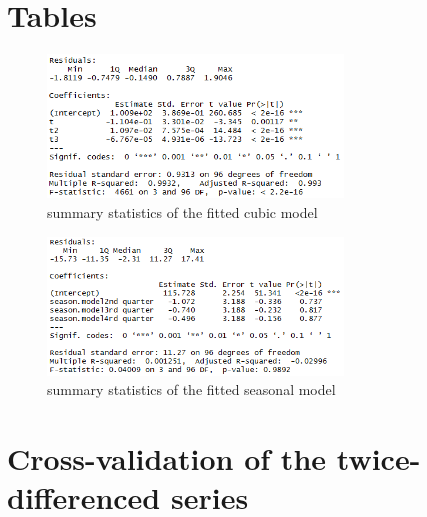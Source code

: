 \documentclass[11pt,a4paper]{article}
\begin{document}
\section{Tables}

\begin{figure}
    \centering
    \includegraphics[angle=0,width=0.7\textwidth]{summary_cubicmodel}
    \caption{summary statistics of the fitted cubic model}
    \label{fig:summary_cubicmodel}
\end{figure}

\begin{figure}
    \centering
    \includegraphics[angle=0,width=0.7\textwidth]{summary_seasonmodel}
    \caption{summary statistics of the fitted seasonal model}
    \label{fig:summary_seasonmodel}
\end{figure}



\section{Cross-validation of the twice-differenced series}
\end{document}
